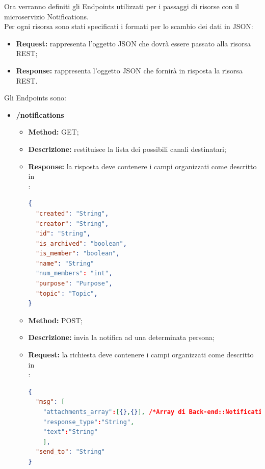 Ora verranno definiti gli Endpoints utilizzati per i passaggi di risorse con il microservizio Notifications. \\
Per ogni risorsa sono stati specificati i formati per lo scambio dei dati in JSON:
\begin{itemize}
\item \textbf{Request:} rappresenta l’oggetto JSON che dovrà essere passato alla risorsa REST;
\item \textbf{Response:} rappresenta l’oggetto JSON che fornirà in risposta la risorsa REST.
\end{itemize}
Gli Endpoints sono:
\begin{itemize}

\item \textbf{/notifications}\\
\begin{itemize}
\item \textbf{Method:} GET;
\item \textbf{Descrizione:} restituisce la lista dei possibili canali destinatari;
\item \textbf{Response:} la risposta deve contenere i campi organizzati come descritto in \\:
\begin{lstlisting}[language=json,firstnumber=1]
{
  "created": "String",
  "creator": "String",
  "id": "String",
  "is_archived": "boolean",
  "is_member": "boolean",
  "name": "String"
  "num_members": "int",
  "purpose": "Purpose",
  "topic": "Topic",
}
\end{lstlisting}
\end{itemize}

\begin{itemize}
\item \textbf{Method:} POST;
\item \textbf{Descrizione:} invia la notifica ad una determinata persona;
\item \textbf{Request:} la richiesta deve contenere i campi organizzati come descritto in \\:
\begin{lstlisting}[language=json,firstnumber=1]
{
  "msg": [
	"attachments_array":[{},{}], /*Array di Back-end::Notifications::Attachment*/
	"response_type":"String",
	"text":"String"
	],
  "send_to": "String"
}
\end{lstlisting}
\end{itemize}
\end{itemize}

